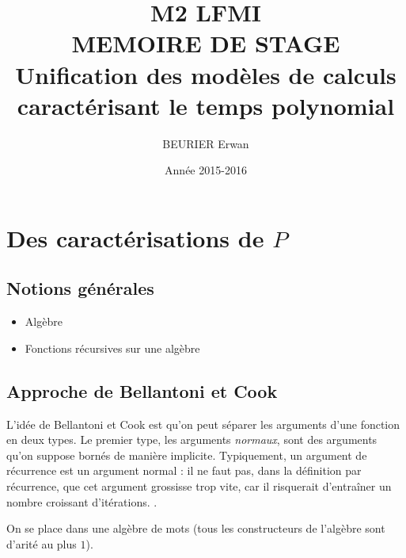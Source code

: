 \documentclass{report}
\author{BEURIER Erwan}
\title{M2 LFMI \\ MEMOIRE DE STAGE \\ Unification des modèles de calculs caractérisant le temps polynomial}
\date{Année 2015-2016}
\begin{document}
	\maketitle
	
	\tableofcontents
	
	\pagebreak
	
	
	\section{Des caractérisations de $P$}
		\label{sec:caracterisations_P}
	
		\subsection{Notions générales}
			\label{subsec:notions_generales}
		
		\begin{itemize}[itemsep=-1mm]
			\item 	Algèbre
			\item 	Fonctions récursives sur une algèbre
		\end{itemize}
		
		
		\subsection{Approche de Bellantoni et Cook}
			\label{subsec:bellantoni_cook}
		
		L'idée de Bellantoni et Cook \cite{BellantoniCook1992} est qu'on peut séparer les arguments d'une fonction en deux types. Le premier type, les arguments \emph{normaux}, sont des arguments qu'on suppose bornés de manière implicite. Typiquement, un argument de récurrence est un argument normal : il ne faut pas, dans la définition par récurrence, que cet argument grossisse trop vite, car il risquerait d'entraîner un nombre croissant d'itérations. .
		
		On se place dans une algèbre de mots (tous les constructeurs de l'algèbre sont d'arité au plus $1$).
		
\end{document}
